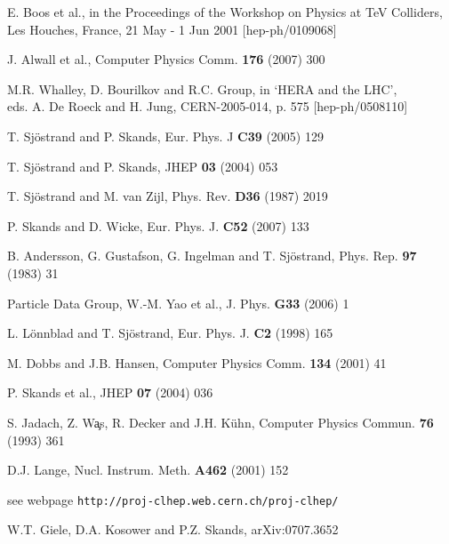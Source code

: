 \documentclass{elsartmod}
\begin{document}
\begin{thebibliography}{99}
E. Boos et al., in the Proceedings of the Workshop on Physics 
at TeV Colliders,\\ 
Les Houches, France, 21 May - 1 Jun 2001 [hep-ph/0109068]

J. Alwall et al., Computer Physics Comm. {\bf 176} (2007) 300

M.R. Whalley, D. Bourilkov and R.C. Group, in `HERA and the LHC',\\ 
eds. A. De Roeck and H. Jung, CERN-2005-014, p. 575 [hep-ph/0508110]

T. Sj\"ostrand and P. Skands, Eur. Phys. J {\bf C39} (2005) 129

T. Sj\"ostrand and P. Skands, JHEP {\bf 03} (2004) 053

T. Sj\"ostrand and M. van Zijl, Phys. Rev. {\bf D36} (1987) 2019

P. Skands and D. Wicke, Eur. Phys. J. {\bf C52} (2007) 133

B. Andersson, G. Gustafson, G. Ingelman and T. Sj\"ostrand,
Phys. Rep. {\bf 97} (1983) 31

Particle Data Group, W.-M. Yao et al., J. Phys. {\bf G33} (2006) 1

L. L\"onnblad and T. Sj\"ostrand, Eur. Phys. J. {\bf C2} (1998) 165

M. Dobbs and J.B. Hansen, Computer Physics Comm. {\bf 134} (2001) 41

P. Skands et al., JHEP {\bf 07} (2004) 036

S. Jadach, Z. W\c{a}s, R. Decker and J.H. K\"uhn,
Computer Physics Commun. {\bf 76} (1993) 361 

D.J. Lange, Nucl. Instrum. Meth. {\bf A462} (2001) 152

see webpage \texttt{http://proj-clhep.web.cern.ch/proj-clhep/}

W.T. Giele, D.A. Kosower and P.Z. Skands, arXiv:0707.3652 

\end{thebibliography}
\end{document}
